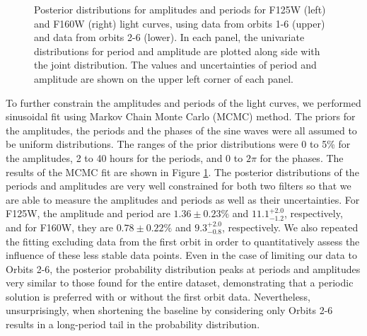 \documentclass[apj]{emulateapj}
\newcommand{\revise}[1]{\textbf{{\color{cyan}{#1}}}}
\renewcommand{\revise}{}
\newcommand{\Jperiod}{$11.1^{+2.0}_{{-1.2}}$}
\newcommand{\Jamp}{$1.36\pm0.23 \%$}
\newcommand{\Hperiod}{$9.3^{+2.0}_{{-0.8}}$}
\newcommand{\Hamp}{$0.78\pm0.22 \%$}
\begin{document}
\begin{figure}
  \centering
{}
  \caption{\revise{Posterior distributions for amplitudes and periods for F125W
    (left) and F160W (right) light curves, using data from orbits 1-6
    (upper) and data from orbits 2-6 (lower). In each panel,
    the univariate distributions for period and amplitude are plotted
    along side with the joint distribution. The values and
    uncertainties of period and amplitude are shown on the upper left
    corner of each panel.}}
  \label{fig:4}
\end{figure}

\revise{To further constrain the amplitudes and periods of the light
  curves, we performed sinusoidal fit using Markov Chain Monte Carlo
  (MCMC) method.  The priors for the amplitudes, the periods and the
  phases of the sine waves were all assumed to be uniform
  distributions. The ranges of the prior distributions were 0 to 5\%
  for the amplitudes, 2 to 40 hours for the periods, and 0 to $2\pi$
  for the phases. The results of the MCMC fit are shown in Figure
  \ref{fig:4}. The posterior distributions of the periods and amplitudes
  are very well constrained for both two filters so that we are able
  to measure the amplitudes and periods as well as their
  uncertainties. For F125W, the amplitude and period are \Jamp{} and
  \Jperiod{}, respectively, and for F160W, they are \Hamp{} and
  \Hperiod{}, respectively. We also repeated the fitting excluding data from the
  first orbit in order to quantitatively assess the influence of these
  less stable data points. Even in the case of limiting
  our data to Orbits 2-6, the posterior probability distribution peaks
  at  periods and amplitudes very similar to those found for the entire dataset,
  demonstrating that a periodic solution is preferred with or without
  the first orbit data. Nevertheless, unsurprisingly, when shortening
  the baseline by considering only Orbits 2-6 results in a long-period
  tail in the probability distribution.}

\end{document}
